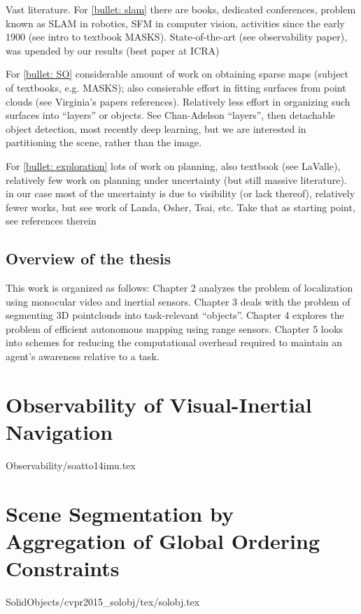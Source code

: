 \documentclass [PhD] {uclathes}
\begin{document}
\begin{enumerate}
Vast literature. For \ref{bullet: slam} there are books, dedicated conferences, problem known as SLAM in robotics, SFM in computer vision, activities since the early 1900 (see intro to textbook MASKS). State-of-the-art (see observability paper), was upended by our results (best paper at ICRA)

For \ref{bullet: SO} considerable amount of work on obtaining sparse maps (subject of textbooks, e.g. MASKS); also consierable effort in fitting surfaces from point clouds (see Virginia's papers references). Relatively less effort in organizing such surfaces into ``layers'' or objects. See Chan-Adelson ``layers'', then detachable object detection, most recently deep learning,  but we are interested in partitioning the scene, rather than the image.

For \ref{bullet: exploration} lots of work on planning, also textbook (see LaValle), relatively few work on planning under uncertainty (but still massive literature). in our case most of the uncertainty is due to visibility (or lack thereof), relatively fewer works, but see work of Landa, Osher, Tsai, etc. Take that as starting point, see references therein

\fi

\section{Overview of the thesis}
This work is organized as follows: Chapter 2 analyzes the problem of localization using monocular video and inertial sensors.
Chapter 3 deals with the problem of segmenting 3D pointclouds into task-relevant ``objects''.
Chapter 4 explores the problem of efficient autonomous mapping using range sensors.
Chapter 5 looks into schemes for reducing the computational overhead required to maintain an agent's
awareness relative to a task.

\chapter{Observability of Visual-Inertial Navigation}
 {Observability/soatto14imu.tex}

\chapter{Scene Segmentation by Aggregation of Global Ordering Constraints}
 {SolidObjects/cvpr2015_solobj/tex/solobj.tex}


\end{enumerate}
\end{document}
